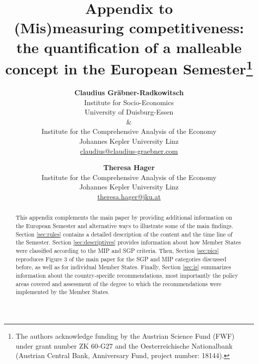 \renewcommand{\thepage}{A\arabic{page}}
\title{
  Appendix to\\ 
  (Mis)measuring competitiveness: the quantification of a malleable concept in the European Semester\thanks{
    The authors acknowledge funding by the Austrian Science Fund (FWF) 
    under grant number ZK 60-G27 and the Oesterreichische Nationalbank 
    (Austrian Central Bank, Anniversary Fund, project number: 18144).}
}

\author{
  \textbf{Claudius Gräbner-Radkowitsch} \\
  Institute for Socio-Economics\\
  University of Duisburg-Essen\\
  \& \\
  Institute for the Comprehensive Analysis of the Economy\\
  Johannes Kepler University Linz\\
  \href{mailto:claudius@claudius-graebner.com}{claudius@claudius-graebner.com} \\
  \and
  \textbf{Theresa Hager}\\
  Institute for the Comprehensive Analysis of the Economy\\
  Johannes Kepler University Linz\\
  \href{mailto:theresa.hager@jku.at}{theresa.hager@jku.at} \\
}
\maketitle
\setcounter{footnote}{0}
\begin{abstract}
\small
This appendix complements the main paper by providing additional information
on the European Semester and alternative ways to illustrate some of the main
findings. Section \ref{sec:rules} contains a detailed description of the 
content and the time line of the Semester.
Section \ref{sec:descriptives} provides information about how Member States 
were classified according to the MIP and SGP criteria.
Then, Section \ref{sec:pics} reproduces Figure 3 of the main paper for the
SGP and MIP categories discussed before, as well as for individual Member States.
Finally, Section \ref{sec:is} summarizes information about the 
country-specific recommendations, most importantly the policy areas covered and 
assessment of the degree to which the recommendations were implemented by the
Member States.

\end{abstract}

\newpage
